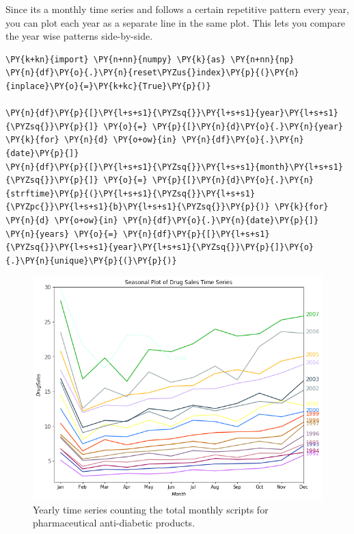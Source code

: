 Since its a monthly time series and follows a certain repetitive pattern
every year, you can plot each year as a separate line in the same plot.
This lets you compare the year wise patterns side-by-side.

\begin{codebox}[breakable, size=fbox, boxrule=1pt, pad at break*=1mm,colback=cellbackground, colframe=cellborder]
\begin{Verbatim}[commandchars=\\\{\}]
\PY{k+kn}{import} \PY{n+nn}{numpy} \PY{k}{as} \PY{n+nn}{np}
\PY{n}{df}\PY{o}{.}\PY{n}{reset\PYZus{}index}\PY{p}{(}\PY{n}{inplace}\PY{o}{=}\PY{k+kc}{True}\PY{p}{)}

\PY{n}{df}\PY{p}{[}\PY{l+s+s1}{\PYZsq{}}\PY{l+s+s1}{year}\PY{l+s+s1}{\PYZsq{}}\PY{p}{]} \PY{o}{=} \PY{p}{[}\PY{n}{d}\PY{o}{.}\PY{n}{year} \PY{k}{for} \PY{n}{d} \PY{o+ow}{in} \PY{n}{df}\PY{o}{.}\PY{n}{date}\PY{p}{]}
\PY{n}{df}\PY{p}{[}\PY{l+s+s1}{\PYZsq{}}\PY{l+s+s1}{month}\PY{l+s+s1}{\PYZsq{}}\PY{p}{]} \PY{o}{=} \PY{p}{[}\PY{n}{d}\PY{o}{.}\PY{n}{strftime}\PY{p}{(}\PY{l+s+s1}{\PYZsq{}}\PY{l+s+s1}{\PYZpc{}}\PY{l+s+s1}{b}\PY{l+s+s1}{\PYZsq{}}\PY{p}{)} \PY{k}{for} \PY{n}{d} \PY{o+ow}{in} \PY{n}{df}\PY{o}{.}\PY{n}{date}\PY{p}{]}
\PY{n}{years} \PY{o}{=} \PY{n}{df}\PY{p}{[}\PY{l+s+s1}{\PYZsq{}}\PY{l+s+s1}{year}\PY{l+s+s1}{\PYZsq{}}\PY{p}{]}\PY{o}{.}\PY{n}{unique}\PY{p}{(}\PY{p}{)}
\end{Verbatim}
\end{codebox}

\begin{figure}[htb]
	\centering
	\includegraphics[width=0.7\linewidth]{figures/yearly_drug_dataset.png}
	\caption{Yearly time series counting the total monthly scripts for pharmaceutical anti-diabetic products.}
	\label{fig:yearly_drug_dataset}
\end{figure}
    
